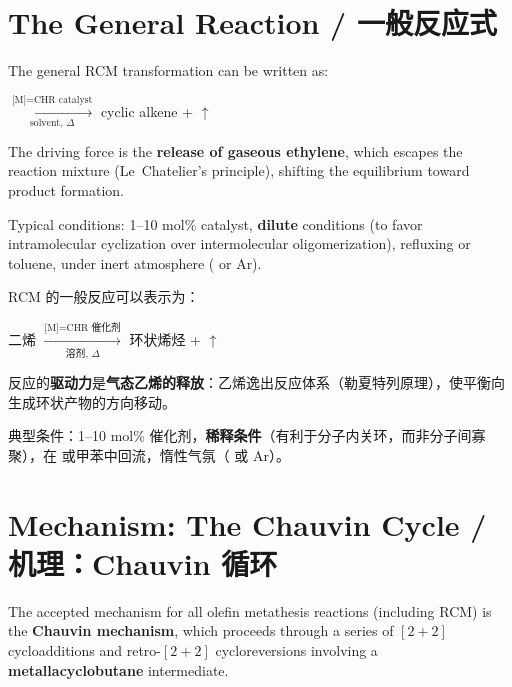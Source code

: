 \documentclass[11pt, a4paper]{article}
\begin{document}
\section{The General Reaction / 一般反应式}

\begin{enbox}[English]
The general RCM transformation can be written as:

\begin{center}
\large
{} $\xrightarrow[\text{solvent, }\Delta]{\text{[M]=CHR catalyst}}$ cyclic alkene +  $\uparrow$
\end{center}

The driving force is the \textbf{release of gaseous ethylene}, which escapes the reaction mixture (Le~Chatelier's principle), shifting the equilibrium toward product formation.

Typical conditions: 1--10 mol\% catalyst, \textbf{dilute} conditions (to favor intramolecular cyclization over intermolecular oligomerization), refluxing  or toluene, under inert atmosphere ( or Ar).
\end{enbox}

\begin{cnbox}[中文]
RCM 的一般反应可以表示为：

\begin{center}
\large
二烯 $\xrightarrow[\text{溶剂, }\Delta]{\text{[M]=CHR 催化剂}}$ 环状烯烃 +  $\uparrow$
\end{center}

反应的\textbf{驱动力}是\textbf{气态乙烯的释放}：乙烯逸出反应体系（勒夏特列原理），使平衡向生成环状产物的方向移动。

典型条件：1--10 mol\% 催化剂，\textbf{稀释条件}（有利于分子内关环，而非分子间寡聚），在  或甲苯中回流，惰性气氛（ 或 Ar）。
\end{cnbox}


\section{Mechanism: The Chauvin Cycle / 机理：Chauvin 循环}

\begin{mechbox}
The accepted mechanism for all olefin metathesis reactions (including RCM) is the \textbf{Chauvin mechanism}, which proceeds through a series of $[2+2]$ cycloadditions and retro-$[2+2]$ cycloreversions involving a \textbf{metallacyclobutane} intermediate.
\end{mechbox}
\end{document}
